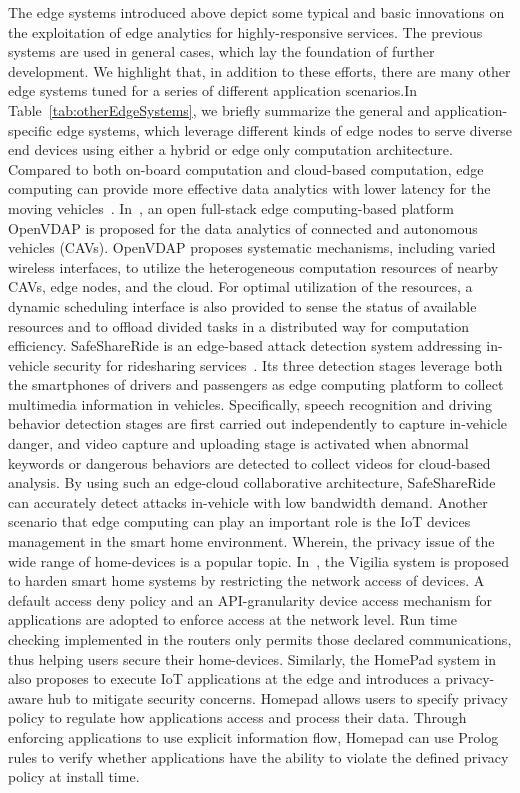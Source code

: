 The edge systems introduced above depict some typical and basic innovations on the exploitation of edge analytics for highly-responsive services. The previous systems are used in general cases, which lay the foundation of further development. We highlight that, in addition to these efforts, there are many other edge systems tuned for a series of different application scenarios.In Table~\ref{tab:otherEdgeSystems}, we briefly summarize the general and application-specific edge systems, which leverage different kinds of edge nodes to serve diverse end devices using either a hybrid or edge only computation architecture.
Compared to both on-board computation and cloud-based computation, edge computing can provide more effective data analytics with lower latency for the moving vehicles~. In~, an open full-stack edge computing-based platform OpenVDAP is proposed for the data analytics of connected and autonomous vehicles (CAVs). OpenVDAP proposes systematic mechanisms, including varied wireless interfaces, to utilize the heterogeneous computation resources of nearby CAVs, edge nodes, and the cloud. For optimal utilization of the resources, a dynamic scheduling interface is also provided to sense the status of available resources and to offload divided tasks in a distributed way for computation efficiency. SafeShareRide is an edge-based attack detection system addressing in-vehicle security for ridesharing services~. Its three detection stages leverage both the smartphones of drivers and passengers as edge computing platform to collect multimedia information in vehicles. Specifically, speech recognition and driving behavior detection stages are first carried out independently to capture in-vehicle danger, and video capture and uploading stage is activated when abnormal keywords or dangerous behaviors are detected to collect videos for cloud-based analysis. By using such an edge-cloud collaborative architecture, SafeShareRide can accurately detect attacks in-vehicle with low bandwidth demand.
Another scenario that edge computing can play an important role is the IoT devices management in the smart home environment. Wherein, the privacy issue of the wide range of home-devices is a popular topic. In~, the Vigilia system is proposed to harden smart home systems by restricting the network access of devices. A default access deny policy and an API-granularity device access mechanism for applications are adopted to enforce access at the network level. Run time checking implemented in the routers only permits those declared communications, thus helping users secure their home-devices. Similarly, the HomePad system in~ also proposes to execute IoT applications at the edge and introduces a privacy-aware hub to mitigate security concerns. Homepad allows users to specify privacy policy to regulate how applications access and process their data. Through enforcing applications to use explicit information flow, Homepad can use Prolog rules to verify whether applications have the ability to violate the defined privacy policy at install time.
